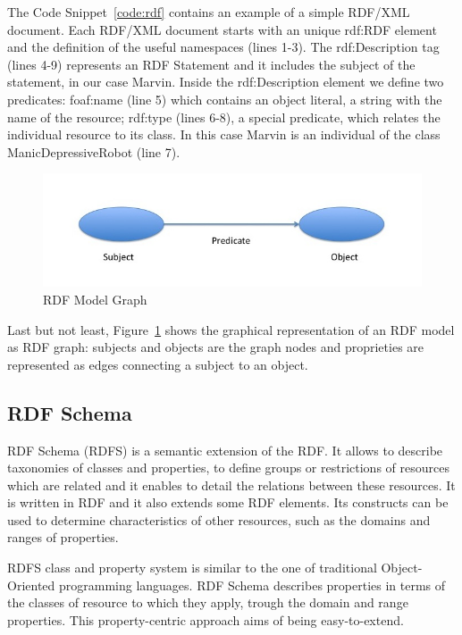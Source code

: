 The Code Snippet~\ref{code:rdf} contains an example of a simple RDF/XML document. Each RDF/XML document starts with an unique rdf:RDF element and the definition of the useful namespaces (lines 1-3). The rdf:Description tag (lines 4-9) represents an RDF Statement and it includes the subject of the statement, in our case Marvin. Inside the rdf:Description element we define two predicates: foaf:name (line 5) which contains an object literal, a string with the name of the resource; rdf:type (lines 6-8), a special predicate, which relates the individual resource to its class. In this case Marvin is an individual of the class ManicDepressiveRobot (line 7).

\begin{figure}[tbh]
  \centering
	\includegraphics[width=0.75\linewidth]{images/rdf-graph}
	\caption{RDF Model Graph} 
  	\label{fig:rdf-graph}
\end{figure}

Last but not least, Figure~\ref{fig:rdf-graph} shows the graphical representation of an RDF model as RDF graph:  subjects and objects are the graph nodes and proprieties are represented as edges connecting a subject to an object. 

\subsection{RDF Schema}\label{sec:rdfs}

RDF Schema (RDFS) is a semantic extension of the RDF. It allows to describe taxonomies of classes and properties, to define groups or restrictions of resources which are related and  it enables to detail the relations between these resources. It is written in RDF and it also extends some RDF elements. Its constructs can be used to determine characteristics of other resources, such as the domains and ranges of properties.

RDFS class and property system is similar to the one of traditional Object-Oriented programming languages. RDF Schema describes properties in terms of the classes of resource to which they apply, trough the domain and range properties. This property-centric approach aims of being easy-to-extend.

